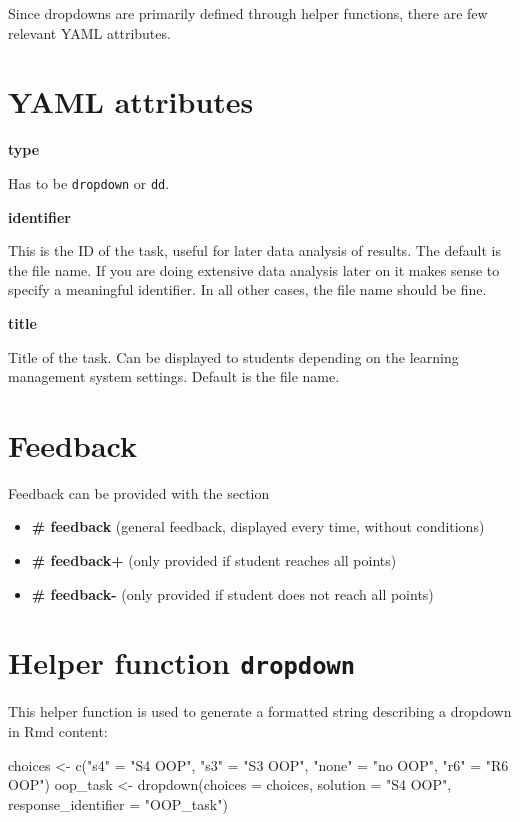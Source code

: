 \documentclass[twoside]{tufte-book}
\newenvironment{Shaded}{}{}
\newcommand{\AttributeTok}[1]{\textcolor[rgb]{0.49,0.56,0.16}{#1}}
\newcommand{\FunctionTok}[1]{\textcolor[rgb]{0.02,0.16,0.49}{#1}}
\newcommand{\NormalTok}[1]{#1}
\newcommand{\OtherTok}[1]{\textcolor[rgb]{0.00,0.44,0.13}{#1}}
\newcommand{\StringTok}[1]{\textcolor[rgb]{0.25,0.44,0.63}{#1}}
\providecommand{\tightlist}{%
  \setlength{\itemsep}{0pt}\setlength{\parskip}{0pt}}
\begin{document}
Since dropdowns are primarily defined through helper functions, there are few relevant YAML attributes.

\section{YAML attributes}\label{YAML-attributes-3}

\noindent\textbf{type}\label{type-3}

Has to be \texttt{dropdown} or \texttt{dd}.

\noindent\textbf{identifier}\label{identifier-3}

This is the ID of the task, useful for later data analysis of results. The default is the file name. If you are doing extensive data analysis later on it makes sense to specify a meaningful identifier. In all other cases, the file name should be fine.

\noindent\textbf{title}\label{title-3}

Title of the task. Can be displayed to students depending on the learning management system settings. Default is the file name.

\section{Feedback}\label{feedback-3}

Feedback can be provided with the section

\begin{itemize}
\tightlist
\item
  \textbf{\# feedback} (general feedback, displayed every time, without conditions)
\item
  \textbf{\# feedback+} (only provided if student reaches all points)
\item
  \textbf{\# feedback-} (only provided if student does not reach all points)
\end{itemize}

\section{\texorpdfstring{Helper function \texttt{dropdown}}{Helper function dropdown}}\label{helper-function-dropdown}

This helper function is used to generate a formatted string describing a dropdown in Rmd content:

\begin{Shaded}
\begin{Highlighting}[]
\NormalTok{choices }\OtherTok{\textless{}{-}} \FunctionTok{c}\NormalTok{(}\StringTok{"s4"} \OtherTok{=} \StringTok{"S4 OOP"}\NormalTok{, }\StringTok{"s3"} \OtherTok{=} \StringTok{"S3 OOP"}\NormalTok{, }\StringTok{"none"} \OtherTok{=} \StringTok{"no OOP"}\NormalTok{, }\StringTok{"r6"} \OtherTok{=} \StringTok{"R6 OOP"}\NormalTok{)}
\NormalTok{oop\_task }\OtherTok{\textless{}{-}} \FunctionTok{dropdown}\NormalTok{(}\AttributeTok{choices =}\NormalTok{ choices, }\AttributeTok{solution =} \StringTok{"S4 OOP"}\NormalTok{,}
                     \AttributeTok{response\_identifier =} \StringTok{"OOP\_task"}\NormalTok{)}
\end{Highlighting}
\end{Shaded}
\end{document}
